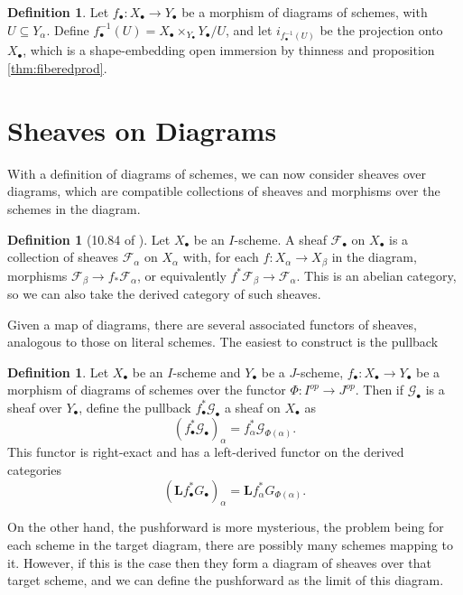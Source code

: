 \documentclass{report}
\theoremstyle{definition}
\newtheorem{definition}[theorem]{Definition}
\newcommand{\FF}{\mathscr{F}}
\newcommand{\GG}{\mathscr{G}}
\newcommand{\bL}{\textbf{L}}
\begin{document}
\begin{definition}
	\label{def:diagrampreimage}
	Let $f_\bullet : X_\bullet \rightarrow Y_\bullet$ be a morphism of diagrams of schemes, with $U \subseteq Y_\alpha$.
	Define $f_\bullet^{-1}(U) = X_\bullet \times_{Y_\bullet} Y_\bullet / U$, and let $i_{f_\bullet^{-1} (U)}$ be the projection onto $X_\bullet$, which is a shape-embedding open immersion by thinness and proposition \ref{thm:fiberedprod}.
\end{definition}

\section{Sheaves on Diagrams}
With a definition of diagrams of schemes, we can now consider sheaves over diagrams, which are compatible collections of sheaves and morphisms over the schemes in the diagram.

\begin{definition}[10.84 of \cite{Kollar2013}]
	Let $X_\bullet$ be an $I$-scheme.
	A sheaf $\FF_\bullet$ on $X_\bullet$ is a collection of sheaves $\FF_\alpha$ on $X_\alpha$ with, for each $f : X_\alpha \rightarrow X_\beta$ in the diagram, morphisms $\FF_\beta \rightarrow f_* \FF_\alpha$, or equivalently $f^* \FF_\beta \rightarrow \FF_\alpha$.
	This is an abelian category, so we can also take the derived category of such sheaves.
\end{definition}

Given a map of diagrams, there are several associated functors of sheaves, analogous to those on literal schemes.
The easiest to construct is the pullback

\begin{definition}
	Let $X_\bullet$ be an $I$-scheme and $Y_\bullet$ be a $J$-scheme, $f_\bullet : X_\bullet \rightarrow Y_\bullet$ be a morphism of diagrams of schemes over the functor $\Phi : I^{op} \rightarrow J^{op}$.
	Then if $\GG_\bullet$ is a sheaf over $Y_\bullet$, define the pullback $f^*_\bullet \GG_\bullet$ a sheaf on $X_\bullet$ as
	\[
	(f^*_\bullet \GG_\bullet)_\alpha = f_\alpha^* \GG_{\Phi(\alpha)}.
	\]
	This functor is right-exact and has a left-derived functor on the derived categories
	\[
	(\bL f^*_\bullet G_\bullet)_\alpha = \bL f_\alpha^* G_{\Phi(\alpha)}.
	\]
\end{definition}

On the other hand, the pushforward is more mysterious, the problem being for each scheme in the target diagram, there are possibly many schemes mapping to it.
However, if this is the case then they form a diagram of sheaves over that target scheme, and we can define the pushforward as the limit of this diagram.
\end{document}

